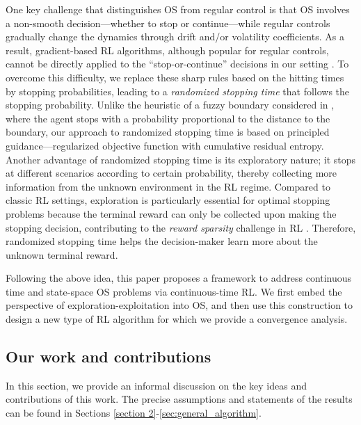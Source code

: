\documentclass[11pt]{amsart}
\theoremstyle{plain}
\numberwithin{equation}{section}
\begin{document}
One key challenge that distinguishes OS from regular control is that OS involves a non-smooth decision—whether to stop or continue—while regular controls gradually change the dynamics through drift and/or volatility coefficients. 
As a result, gradient-based RL algorithms, although popular for regular controls, cannot be directly applied to the ``stop-or-continue'' decisions in our setting \cite{reppen2022neural,soner2023stopping}. 
To overcome this difficulty, we replace these sharp rules based on the hitting times by stopping probabilities, leading to a {\it randomized stopping time} that follows the stopping probability. 
Unlike the heuristic of a fuzzy boundary considered in \cite{reppen2022neural}, where the agent stops with a probability proportional to the distance to the boundary, our approach to randomized stopping time is based on principled guidance—regularized objective function with cumulative residual entropy.  
Another advantage of randomized stopping time is its exploratory nature; it stops at different scenarios according to certain probability, thereby collecting more information from the unknown environment in the RL regime. 
Compared to classic RL settings, exploration is particularly essential for optimal stopping problems because the terminal reward can only be collected upon making the stopping decision, contributing to the {\it reward sparsity} challenge in RL \cite{devidze2022exploration,hare2019dealing}.
Therefore, randomized stopping time helps the decision-maker learn more about the unknown terminal reward.


Following the above idea, this paper proposes a framework to address continuous time and state-space OS problems via continuous-time RL. 
We first embed the perspective of exploration-exploitation into OS, and then use this construction to design a new type of RL algorithm for which we provide a convergence analysis. 

\subsection{Our work and contributions}
In this section, we provide an informal discussion on the key ideas and contributions of this work. 
The precise assumptions and statements of the results can be found in Sections \ref{section 2}-\ref{sec:general_algorithm}.
\end{document}
